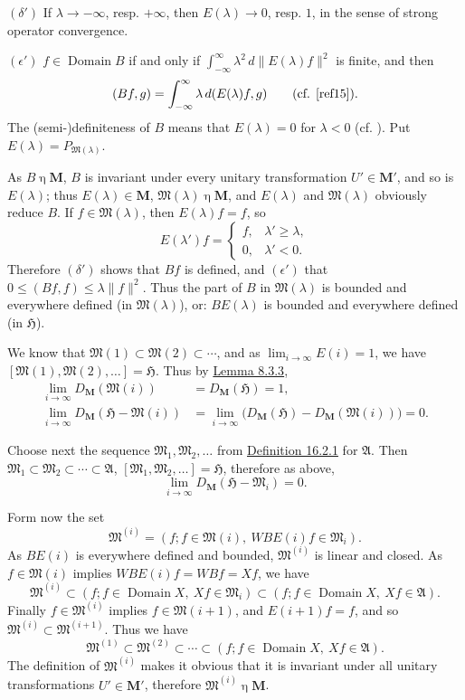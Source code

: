 \documentclass[12pt,b5paper,twoside]{article}
\newcommand{\Hspace}{\mathfrak H}
\newcommand{\M}{\mathbf M}
\newcommand{\defref}[1]{\hyperref[def:#1]{Definition #1}}
\newcommand{\lemref}[1]{\hyperref[lem:#1]{Lemma #1}}
\begin{document}
\noindent\((\delta')\) If \(\lambda\to-\infty\), resp.
\(+\infty\), then \(E(\lambda)\to0\), resp. \(1\), in the sense of strong
operator convergence.

\noindent\((\epsilon')\) \(f\in\operatorname{Domain}B\) if and only if
\(\int_{-\infty}^{\infty}\lambda^2\,d\lVert E(\lambda)f\rVert^2\) is
finite, and then
\[
(Bf,g)=\int_{-\infty}^{\infty}\lambda\,d(E(\lambda)f,g)
\qquad\text{(cf. \cite[p.~92]{ref15}).}
\]
The (semi-)definiteness of \(B\) means that \(E(\lambda)=0\) for
\(\lambda<0\) (cf. \cite[p.~302]{ref21}). Put
\(E(\lambda)=P_{\mathfrak M(\lambda)}\).

As \(B\mathbin\eta\M\), \(B\) is invariant under every unitary
transformation \(U'\in\M'\), and so is \(E(\lambda)\); thus
\(E(\lambda)\in\M\), \(\mathfrak M(\lambda)\mathbin\eta\M\), and
\(E(\lambda)\) and \(\mathfrak M(\lambda)\) obviously reduce \(B\). If
\(f\in\mathfrak M(\lambda)\), then \(E(\lambda)f=f\), so
\[
E(\lambda')f=
\begin{cases}
f,&\lambda'\geq\lambda,\\
0,&\lambda'<0.
\end{cases}
\]
Therefore \((\delta')\) shows that \(Bf\) is defined, and \((\epsilon')\) that
\(0\leq(Bf,f)\leq\lambda\lVert f\rVert^2\). Thus the part of \(B\) in
\(\mathfrak M(\lambda)\) is bounded and everywhere defined (in
\(\mathfrak M(\lambda)\)), or: \(BE(\lambda)\) is bounded and everywhere
defined (in \(\Hspace\)).

We know that \(\mathfrak M(1)\subset\mathfrak M(2)\subset\cdots\), and as
\(\lim_{i\to\infty}E(i)=1\), we have
\([\mathfrak M(1),\mathfrak M(2),\allowbreak\ldots]=\Hspace\). Thus by
\lemref{8.3.3},
\[
\begin{aligned}
\lim_{i\to\infty}D_{\M}(\mathfrak M(i))
 &=D_{\M}(\Hspace)=1,\\
\lim_{i\to\infty}D_{\M}(\Hspace-\mathfrak M(i))
 &=\lim_{i\to\infty}
   \bigl(D_{\M}(\Hspace)-D_{\M}(\mathfrak M(i))\bigr)=0.
\end{aligned}
\]

Choose next the sequence \(\mathfrak M_1,\mathfrak M_2,\ldots\) from
\defref{16.2.1} for \(\mathfrak A\). Then
\(\mathfrak M_1\subset\mathfrak M_2\subset\cdots\subset\mathfrak A\),
\([\mathfrak M_1,\mathfrak M_2,\ldots]=\Hspace\), therefore as above,
\[
\lim_{i\to\infty}D_{\M}(\Hspace-\mathfrak M_i)=0.
\]

Form now the set
\[
\mathfrak M^{(i)}=(f;f\in\mathfrak M(i),\ WBE(i)f\in\mathfrak M_i).
\]
As \(BE(i)\) is everywhere defined and bounded, \(\mathfrak M^{(i)}\) is
linear and closed. As \(f\in\mathfrak M(i)\) implies
\(WBE(i)f=WBf=Xf\), we have
\[
\mathfrak M^{(i)}
\subset(f;f\in\operatorname{Domain}X,\ Xf\in\mathfrak M_i)
\subset(f;f\in\operatorname{Domain}X,\ Xf\in\mathfrak A).
\]
Finally \(f\in\mathfrak M^{(i)}\) implies
\(f\in\mathfrak M(i+1)\), and \(E(i+1)f=f\), and so
\(\mathfrak M^{(i)}\subset\mathfrak M^{(i+1)}\). Thus we have
\[
\mathfrak M^{(1)}\subset\mathfrak M^{(2)}\subset\cdots
\subset(f;f\in\operatorname{Domain}X,\ Xf\in\mathfrak A).
\]
The definition of \(\mathfrak M^{(i)}\) makes it obvious that it is invariant
under all unitary transformations \(U'\in\M'\), therefore
\(\mathfrak M^{(i)}\mathbin\eta\M\).
\end{document}
